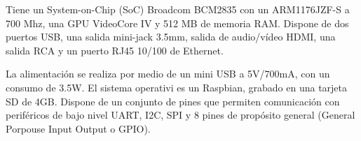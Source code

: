 \documentclass[twoside,11pt]{book}
\begin{document}

Tiene un System-on-Chip (SoC) Broadcom BCM2835 con un ARM1176JZF-S a 700 Mhz, una GPU VideoCore IV y 512 MB de memoria RAM. Dispone de dos puertos USB, una salida mini-jack 3.5mm, salida de audio/vídeo HDMI, una salida RCA y un puerto  RJ45 10/100 de Ethernet. 

La alimentación se realiza por medio de un mini USB a 5V/700mA, con un consumo de 3.5W. El sistema operativi es un Raspbian, grabado en una tarjeta SD de 4GB. Dispone de un conjunto de pines que permiten comunicación con periféricos de bajo nivel UART, I2C, SPI y 8 pines de propósito general (General Porpouse Input Output o GPIO).
\end{document}
